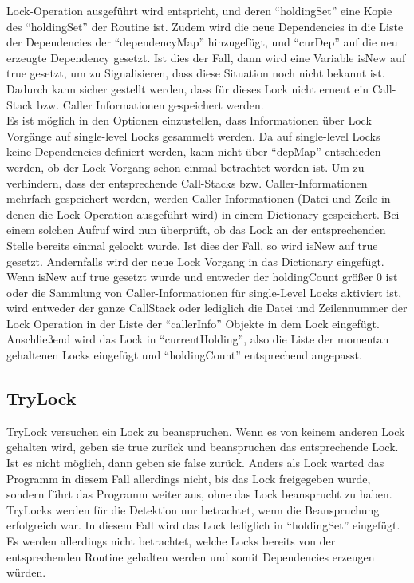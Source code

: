 Lock-Operation ausgeführt wird entspricht, und deren ``holdingSet'' eine 
Kopie des ``holdingSet'' der Routine ist. Zudem wird die neue Dependencies
in die Liste der Dependencies der ``dependencyMap'' hinzugefügt, und ``curDep''
auf die neu erzeugte Dependency gesetzt. Ist dies der Fall, dann wird eine 
Variable isNew auf true gesetzt, um zu Signalisieren, dass diese Situation 
noch nicht bekannt ist.
Dadurch kann sicher gestellt werden, dass für dieses Lock nicht erneut 
ein Call-Stack bzw. Caller Informationen gespeichert werden.\\
Es ist möglich in den Optionen einzustellen, dass Informationen über Lock 
Vorgänge auf single-level Locks gesammelt werden. Da auf single-level Locks keine
Dependencies definiert werden, kann nicht über ``depMap'' entschieden werden, 
ob der Lock-Vorgang schon einmal betrachtet worden ist. Um zu verhindern, dass 
der entsprechende Call-Stacks bzw. Caller-Informationen mehrfach gespeichert 
werden, werden Caller-Informationen (Datei und Zeile in denen die Lock Operation 
ausgeführt wird) in einem Dictionary gespeichert. Bei einem solchen Aufruf wird
nun überprüft, ob das Lock an der entsprechenden Stelle bereits einmal gelockt 
wurde. Ist dies der Fall, so wird isNew auf true gesetzt. Andernfalls wird der 
neue Lock Vorgang in das Dictionary eingefügt.\\
Wenn isNew auf true gesetzt wurde und entweder der holdingCount größer 0 ist 
oder die Sammlung von Caller-Informationen für single-Level Locks aktiviert ist,
wird entweder der ganze CallStack oder lediglich die Datei und Zeilennummer der 
Lock Operation in der Liste der ``callerInfo'' Objekte in dem Lock eingefügt.
Anschließend wird das Lock in ``currentHolding'', also die Liste der momentan
gehaltenen Locks eingefügt und ``holdingCount'' entsprechend angepasst.


\subsection{TryLock}\label{Chap::Implementation:Logging.TryLock}
TryLock versuchen ein Lock zu beanspruchen. Wenn es von keinem anderen Lock 
gehalten wird, geben sie true zurück und beanspruchen das entsprechende Lock. 
Ist es nicht möglich, dann geben sie false zurück. Anders als Lock warted das 
Programm in diesem Fall allerdings nicht, bis das Lock freigegeben wurde, sondern
führt das Programm weiter aus, ohne das Lock beansprucht zu haben.\\ 
TryLocks werden für die Detektion nur betrachtet, wenn die Beanspruchung 
erfolgreich war. In diesem Fall wird das Lock lediglich in ``holdingSet'' 
eingefügt.
Es werden allerdings nicht betrachtet, welche Locks bereits von der 
entsprechenden Routine gehalten werden und somit Dependencies erzeugen 
würden.

